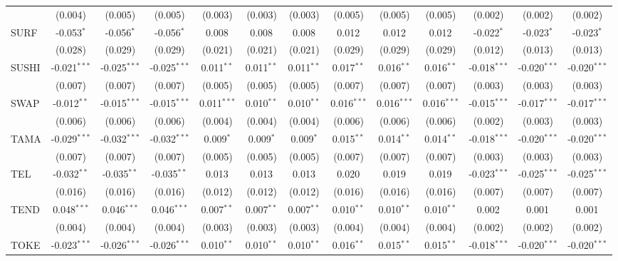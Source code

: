 \begin{table}[!htbp]
\begin{tabular}{@{\extracolsep{5pt}}lcccccccccccc}
  & (0.004) & (0.005) & (0.005) & (0.003) & (0.003) & (0.003) & (0.005) & (0.005) & (0.005) & (0.002) & (0.002) & (0.002) \\
 SURF & -0.053$^{*}$ & -0.056$^{*}$ & -0.056$^{*}$ & 0.008$^{}$ & 0.008$^{}$ & 0.008$^{}$ & 0.012$^{}$ & 0.012$^{}$ & 0.012$^{}$ & -0.022$^{*}$ & -0.023$^{*}$ & -0.023$^{*}$ \\
  & (0.028) & (0.029) & (0.029) & (0.021) & (0.021) & (0.021) & (0.029) & (0.029) & (0.029) & (0.012) & (0.013) & (0.013) \\
 SUSHI & -0.021$^{***}$ & -0.025$^{***}$ & -0.025$^{***}$ & 0.011$^{**}$ & 0.011$^{**}$ & 0.011$^{**}$ & 0.017$^{**}$ & 0.016$^{**}$ & 0.016$^{**}$ & -0.018$^{***}$ & -0.020$^{***}$ & -0.020$^{***}$ \\
  & (0.007) & (0.007) & (0.007) & (0.005) & (0.005) & (0.005) & (0.007) & (0.007) & (0.007) & (0.003) & (0.003) & (0.003) \\
 SWAP & -0.012$^{**}$ & -0.015$^{***}$ & -0.015$^{***}$ & 0.011$^{***}$ & 0.010$^{**}$ & 0.010$^{**}$ & 0.016$^{***}$ & 0.016$^{***}$ & 0.016$^{***}$ & -0.015$^{***}$ & -0.017$^{***}$ & -0.017$^{***}$ \\
  & (0.006) & (0.006) & (0.006) & (0.004) & (0.004) & (0.004) & (0.006) & (0.006) & (0.006) & (0.002) & (0.003) & (0.003) \\
 TAMA & -0.029$^{***}$ & -0.032$^{***}$ & -0.032$^{***}$ & 0.009$^{*}$ & 0.009$^{*}$ & 0.009$^{*}$ & 0.015$^{**}$ & 0.014$^{**}$ & 0.014$^{**}$ & -0.018$^{***}$ & -0.020$^{***}$ & -0.020$^{***}$ \\
  & (0.007) & (0.007) & (0.007) & (0.005) & (0.005) & (0.005) & (0.007) & (0.007) & (0.007) & (0.003) & (0.003) & (0.003) \\
 TEL & -0.032$^{**}$ & -0.035$^{**}$ & -0.035$^{**}$ & 0.013$^{}$ & 0.013$^{}$ & 0.013$^{}$ & 0.020$^{}$ & 0.019$^{}$ & 0.019$^{}$ & -0.023$^{***}$ & -0.025$^{***}$ & -0.025$^{***}$ \\
  & (0.016) & (0.016) & (0.016) & (0.012) & (0.012) & (0.012) & (0.016) & (0.016) & (0.016) & (0.007) & (0.007) & (0.007) \\
 TEND & 0.048$^{***}$ & 0.046$^{***}$ & 0.046$^{***}$ & 0.007$^{**}$ & 0.007$^{**}$ & 0.007$^{**}$ & 0.010$^{**}$ & 0.010$^{**}$ & 0.010$^{**}$ & 0.002$^{}$ & 0.001$^{}$ & 0.001$^{}$ \\
  & (0.004) & (0.004) & (0.004) & (0.003) & (0.003) & (0.003) & (0.004) & (0.004) & (0.004) & (0.002) & (0.002) & (0.002) \\
 TOKE & -0.023$^{***}$ & -0.026$^{***}$ & -0.026$^{***}$ & 0.010$^{**}$ & 0.010$^{**}$ & 0.010$^{**}$ & 0.016$^{**}$ & 0.015$^{**}$ & 0.015$^{**}$ & -0.018$^{***}$ & -0.020$^{***}$ & -0.020$^{***}$ \\

\end{tabular}
\end{table}
